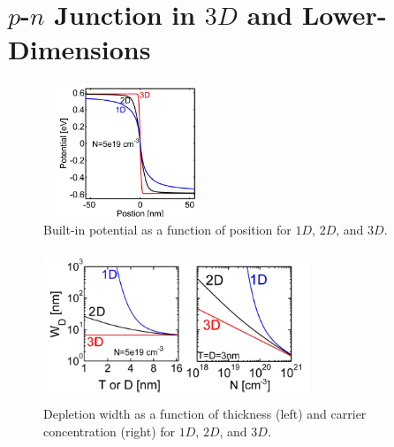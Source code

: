 \section{$p$-$n$ Junction in $3D$ and Lower-Dimensions}\label{sec:sec004}

\begin{figure}[h!]\label{fig:fig09}
    \centering
    \includegraphics[height=4cm,width=5cm]{figs/2d_3d}
    \caption{Built-in potential as a function of position for $1D$, $2D$, and $3D$.}
\end{figure}

\begin{figure}[h!]\label{fig:fig08}
    \centering
    \includegraphics[height=4.5cm,width=8cm]{figs/2d_3d_wd_dep}
    \caption{Depletion width as a function of thickness (left) and carrier concentration (right) for $1D$, $2D$, and $3D$.}
\end{figure}